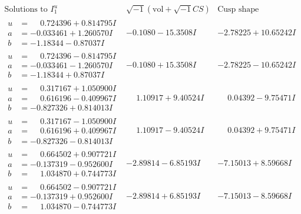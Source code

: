 \documentclass[1p]{elsarticle_modified}
\theoremstyle{definition}
\newcommand{\I}{\sqrt{-1}}
\begin{document}
$$\begin{array}{c|c|c}  
\text{Solutions to }I^u_{1}& \I (\text{vol} + \sqrt{-1}CS) & \text{Cusp shape}\\
 \hline 
\begin{aligned}
u &= \phantom{-}0.724396 + 0.814795 I \\
a &= -0.033461 + 1.260570 I \\
b &= -1.18344 - 0.87037 I\end{aligned}
 & -0.1080 - 15.3508 I & -2.78225 + 10.65242 I \\ \hline\begin{aligned}
u &= \phantom{-}0.724396 - 0.814795 I \\
a &= -0.033461 - 1.260570 I \\
b &= -1.18344 + 0.87037 I\end{aligned}
 & -0.1080 + 15.3508 I & -2.78225 - 10.65242 I \\ \hline\begin{aligned}
u &= \phantom{-}0.317167 + 1.050900 I \\
a &= \phantom{-}0.616196 - 0.409967 I \\
b &= -0.827326 + 0.814013 I\end{aligned}
 & \phantom{-}1.10917 + 9.40524 I & \phantom{-}0.04392 - 9.75471 I \\ \hline\begin{aligned}
u &= \phantom{-}0.317167 - 1.050900 I \\
a &= \phantom{-}0.616196 + 0.409967 I \\
b &= -0.827326 - 0.814013 I\end{aligned}
 & \phantom{-}1.10917 - 9.40524 I & \phantom{-}0.04392 + 9.75471 I \\ \hline\begin{aligned}
u &= \phantom{-}0.664502 + 0.907721 I \\
a &= -0.137319 - 0.952600 I \\
b &= \phantom{-}1.034870 + 0.744773 I\end{aligned}
 & -2.89814 - 6.85193 I & -7.15013 + 8.59668 I \\ \hline\begin{aligned}
u &= \phantom{-}0.664502 - 0.907721 I \\
a &= -0.137319 + 0.952600 I \\
b &= \phantom{-}1.034870 - 0.744773 I\end{aligned}
 & -2.89814 + 6.85193 I & -7.15013 - 8.59668 I \\ \hline\begin{aligned}

\end{aligned}
\end{array}$$
\end{document}
